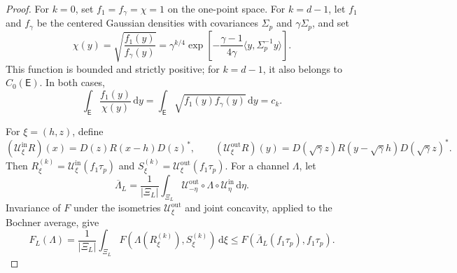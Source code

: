 \documentclass[11pt]{article}
\theoremstyle{remark}
\theoremstyle{plain}
\newcommand{\dd}{\mathrm d}
\begin{document}
\begin{proof}
For \(k=0\), set \(f_1=f_\gamma=\chi=1\) on the one-point space.  For
\(k=d-1\), let \(f_1\) and \(f_\gamma\) be the centered Gaussian densities
with covariances \(\Sigma_p\) and \(\gamma\Sigma_p\), and set
\[
  \chi(y)=\sqrt{\frac{f_1(y)}{f_\gamma(y)}}
  =\gamma^{k/4}
   \exp\!\left[-\frac{\gamma-1}{4\gamma}
     \langle y,\Sigma_p^{-1}y\rangle\right].
\]
This function is bounded and strictly positive; for \(k=d-1\), it also
belongs to \(C_0(\mathsf E)\).  In both cases,
\begin{equation}\label{eq:classical-witness-identity}
  \int_{\mathsf E}\frac{f_1(y)}{\chi(y)}\,\dd y
  =\int_{\mathsf E}\sqrt{f_1(y)f_\gamma(y)}\,\dd y
  =c_k.
\end{equation}

For \(\xi=(h,z)\), define
\[
  (\mathcal U_\xi^{\mathrm{in}}R)(x)
  =D(z)R(x-h)D(z)^*,
  \qquad
  (\mathcal U_\xi^{\mathrm{out}}R)(y)
  =D(\sqrt\gamma z)R(y-\sqrt\gamma h)D(\sqrt\gamma z)^*.
\]
Then
\(R_\xi^{(k)}=\mathcal U_\xi^{\mathrm{in}}(f_1\tau_p)\) and
\(S_\xi^{(k)}=\mathcal U_\xi^{\mathrm{out}}(f_1\tau_p)\).  For a channel
\(\Lambda\), let
\[
  \overline\Lambda_L
  =\frac1{|\Xi_L|}\int_{\Xi_L}
   \mathcal U_{-\eta}^{\mathrm{out}}\circ\Lambda\circ
   \mathcal U_\eta^{\mathrm{in}}\,\dd\eta.
\]
Invariance of \(F\) under the isometries
\(\mathcal U_\xi^{\mathrm{out}}\) and joint concavity, applied to the Bochner
average, give
\begin{equation}\label{eq:unified-folner-concavity}
  F_L(\Lambda)
  =\frac1{|\Xi_L|}\int_{\Xi_L}
  F\!\left(\Lambda(R_\xi^{(k)}),S_\xi^{(k)}\right)\,\dd\xi
  \le F(\overline\Lambda_L(f_1\tau_p),f_1\tau_p).
\end{equation}


\end{proof}
\end{document}
